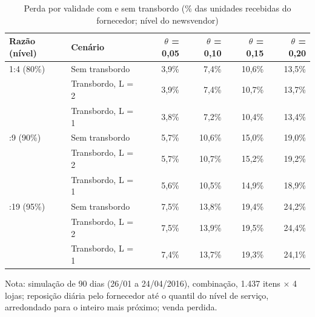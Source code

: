\begin{table}[htbp]
\centering
\small
\caption{Perda por validade com e sem transbordo (\% das unidades recebidas do fornecedor; nível do newsvendor)}
\label{tab:tb_perda}
\begin{tabular}{llrrrr}
\toprule
Razão (nível) & Cenário & $\theta$ = 0,05 & $\theta$ = 0,10 & $\theta$ = 0,15 & $\theta$ = 0,20 \\
\midrule
1:4 (80\%) & Sem transbordo & 3,9\% & 7,4\% & 10,6\% & 13,5\% \\
 & Transbordo, L = 2 & 3,9\% & 7,4\% & 10,7\% & 13,7\% \\
 & Transbordo, L = 1 & 3,8\% & 7,2\% & 10,4\% & 13,4\% \\
\addlinespace
1:9 (90\%) & Sem transbordo & 5,7\% & 10,6\% & 15,0\% & 19,0\% \\
 & Transbordo, L = 2 & 5,7\% & 10,7\% & 15,2\% & 19,2\% \\
 & Transbordo, L = 1 & 5,6\% & 10,5\% & 14,9\% & 18,9\% \\
\addlinespace
1:19 (95\%) & Sem transbordo & 7,5\% & 13,8\% & 19,4\% & 24,2\% \\
 & Transbordo, L = 2 & 7,5\% & 13,9\% & 19,5\% & 24,4\% \\
 & Transbordo, L = 1 & 7,4\% & 13,7\% & 19,3\% & 24,1\% \\
\bottomrule
\end{tabular}
\par\smallskip
{\footnotesize Nota: simulação de 90 dias (26/01 a 24/04/2016), combinação, 1.437 itens × 4 lojas; reposição diária pelo fornecedor até o quantil do nível de serviço, arredondado para o inteiro mais próximo; venda perdida.}
\end{table}
